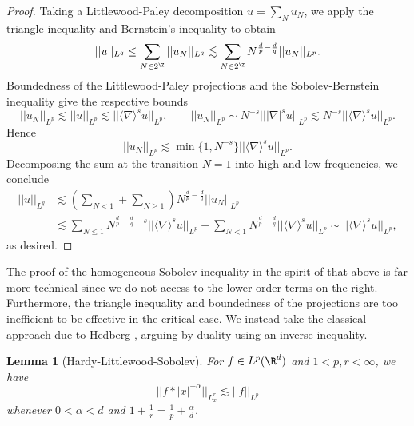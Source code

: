 \documentclass[reqno]{amsart}
\newtheorem{lemma}[theorem]{Lemma}
\theoremstyle{definition}
\theoremstyle{remark}
\begin{document}
\begin{proof}
	Taking a Littlewood-Paley decomposition $u = \sum_N u_N$, we apply the triangle inequality and Bernstein's inequality to obtain
		\[ ||u||_{L^q} \leq \sum_{N \in 2^\Z} ||u_N||_{L^q} \lesssim \sum_{N \in 2^\Z} N^{\frac{d}{p} - \frac{d}{q}} ||u_N||_{L^p}. \]
	Boundedness of the Littlewood-Paley projections and the Sobolev-Bernstein inequality give the respective bounds	
		\[ ||u_N||_{L^p} \lesssim ||u||_{L^p} \lesssim || \langle \nabla \rangle^s u||_{L^p}, \qquad ||u_N||_{L^p} \sim N^{-s} |||\nabla|^s u||_{L^p}\lesssim N^{-s} || \langle \nabla \rangle^s u||_{L^p}. \]
	Hence
		\[ ||u_N||_{L^p} \lesssim \min\{ 1, N^{-s} \} || \langle \nabla \rangle^s u||_{L^p}.\]
	Decomposing the sum at the transition $N = 1$ into high and low frequencies, we conclude
		\begin{align*}
			 ||u||_{L^q} 
			 	&\lesssim \left( \sum_{N < 1} + \sum_{N \geq 1} \right) N^{\frac{d}{p} - \frac{d}{q}} ||u_N||_{L^p} \\
			 	&\lesssim \sum_{N \leq 1} N^{\frac{d}{p} - \frac{d}{q} -s} || \langle \nabla \rangle^s u||_{L^p} +  \sum_{N < 1} N^{\frac{d}{p} - \frac{d}{q}} || \langle \nabla \rangle^s u||_{L^p} \sim || \langle \nabla \rangle^s u||_{L^p},
		\end{align*}	 
	as desired. 	
\end{proof}

The proof of the homogeneous Sobolev inequality in the spirit of that above is far more technical since we do not access to the lower order terms on the right. Furthermore, the triangle inequality and boundedness of the projections are too inefficient to be effective in the critical case. We instead take the classical approach due to Hedberg \cite{Hedberg}, arguing by duality using an inverse inequality.

\begin{lemma}[Hardy-Littlewood-Sobolev]
	For $f \in L^p (\R^d)$ and $1 < p, r < \infty$, we have
		\[ ||f * |x|^{-\alpha}||_{L^r_x} \lesssim ||f||_{L^p} \]
	whenever $0 < \alpha < d$ and $1 + \tfrac1r = \tfrac1p + \tfrac{\alpha}{d}$. 	
\end{lemma}
\end{document}
